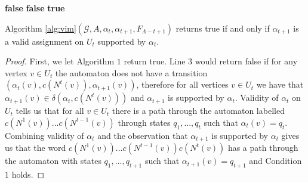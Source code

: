 \documentclass[runningheads]{llncs}
\begin{document}
\begin{toappendix}
\begin{algorithm}
\begin{algorithmic}[1]
    \State \Return \textbf{false}
    \EndIf
    \EndFor
    \State \Return \textbf{false}
    \EndIf
    \EndFor
    \State \Return \textbf{true}
        \end{algorithmic}
        \end{algorithm}
        
\begin{lemma} \label{lem:algStep}
Algorithm \ref{alg:vim}$(\mathcal{G},A,\alpha_t,\alpha_{t+1},F_{\Lambda-t+1})$ returns true if and only if $\alpha_{t+1}$ is a valid assignment on $U_t$ supported by $\alpha_t$.
\end{lemma}
\begin{proof}
First, we let Algorithm $1$ return true.
Line $3$ would return false if for any vertex $v \in U_t$ the automaton does not have a transition $(\alpha_t(v),c(N^{t}(v)),\alpha_{t+1}(v))$, therefore for all vertices $v \in U_t$ we have that $\alpha_{t+1}(v) \in \delta(\alpha_t,c(N^t(v)))$ and $\alpha_{t+1}$ is supported by $\alpha_t$.
Validity of $\alpha_t$ on $U_t$ tells us that for all $v \in U_t$ there is a path through the automaton labelled $c(N^1(v))...c(N^{t-1}(v))$ through states $q_1,...,q_{t}$ such that $\alpha_{t}(v)=q_{t}$. Combining validity of $\alpha_t$ and the observation that $\alpha_{t+1}$ is supported by $\alpha_t$ gives us that the word $c(N^1(v))...c(N^{t-1}(v))c(N^{t}(v))$ has a path through the automaton with states $q_1,...,q_{t+1}$ such that $\alpha_{t+1}(v)=q_{t+1}$ and Condition $1$ holds.


\end{proof}
\end{toappendix}
\end{document}
